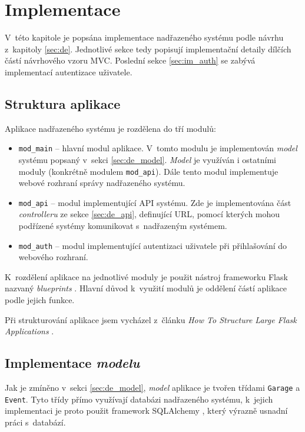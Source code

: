 \chapter{Implementace}
\label{sec:im}

V~této kapitole je popsána implementace nadřazeného systému podle návrhu z~kapitoly \ref{sec:de}. Jednotlivé sekce tedy popisují implementační detaily dílčích částí návrhového vzoru MVC. Poslední sekce \ref{sec:im_auth} se zabývá implementací autentizace uživatele.

\section{Struktura aplikace}

Aplikace nadřazeného systému je rozdělena do tří modulů:

\begin{itemize}
    \item \texttt{mod\_main} -- hlavní modul aplikace. V~tomto modulu je implementován \textit{model} systému popsaný v~sekci \ref{sec:de_model}. \textit{Model} je využíván i ostatními moduly (konkrétně modulem \texttt{mod\_api}). Dále tento modul implementuje webové rozhraní správy nadřazeného systému.
    \item \texttt{mod\_api} -- modul implementující API systému. Zde je implementována část \textit{controlleru} ze sekce \ref{sec:de_api}, definující URL, pomocí kterých mohou podřízené systémy komunikovat s~nadřazeným systémem.
    \item \texttt{mod\_auth} -- modul implementující autentizaci uživatele při přihlašování do webového rozhraní.
\end{itemize}

K~rozdělení aplikace na jednotlivé moduly je použit nástroj frameworku Flask nazvaný \textit{blueprints} \cite{flask_blueprints}.  Hlavní důvod k~využití modulů je oddělení částí aplikace podle jejich funkce.

Při strukturování aplikace jsem vycházel z~článku \textit{How To Structure Large Flask Applications} \cite{flask_large}.

\section{Implementace \textit{modelu}}

Jak je zmíněno v~sekci \ref{sec:de_model}, \textit{model} aplikace je tvořen třídami \texttt{Garage} a \texttt{Event}. Tyto třídy přímo využívají databázi nadřazeného systému, k~jejich implementaci je proto použit framework SQLAlchemy \cite{sqlalchemy}, který výrazně usnadní práci s~databází.

